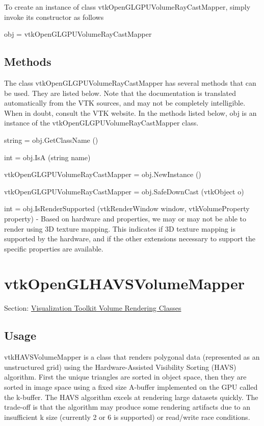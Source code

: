 To create an instance of class vtk\-Open\-G\-L\-G\-P\-U\-Volume\-Ray\-Cast\-Mapper, simply invoke its constructor as follows \begin{DoxyVerb}  obj = vtkOpenGLGPUVolumeRayCastMapper
\end{DoxyVerb}
 \hypertarget{vtkwidgets_vtkxyplotwidget_Methods}{}\subsection{Methods}\label{vtkwidgets_vtkxyplotwidget_Methods}
The class vtk\-Open\-G\-L\-G\-P\-U\-Volume\-Ray\-Cast\-Mapper has several methods that can be used. They are listed below. Note that the documentation is translated automatically from the V\-T\-K sources, and may not be completely intelligible. When in doubt, consult the V\-T\-K website. In the methods listed below, {\ttfamily obj} is an instance of the vtk\-Open\-G\-L\-G\-P\-U\-Volume\-Ray\-Cast\-Mapper class. 
\begin{DoxyItemize}
\item {\ttfamily string = obj.\-Get\-Class\-Name ()}  
\item {\ttfamily int = obj.\-Is\-A (string name)}  
\item {\ttfamily vtk\-Open\-G\-L\-G\-P\-U\-Volume\-Ray\-Cast\-Mapper = obj.\-New\-Instance ()}  
\item {\ttfamily vtk\-Open\-G\-L\-G\-P\-U\-Volume\-Ray\-Cast\-Mapper = obj.\-Safe\-Down\-Cast (vtk\-Object o)}  
\item {\ttfamily int = obj.\-Is\-Render\-Supported (vtk\-Render\-Window window, vtk\-Volume\-Property property)} -\/ Based on hardware and properties, we may or may not be able to render using 3\-D texture mapping. This indicates if 3\-D texture mapping is supported by the hardware, and if the other extensions necessary to support the specific properties are available.  
\end{DoxyItemize}\hypertarget{vtkvolumerendering_vtkopenglhavsvolumemapper}{}\section{vtk\-Open\-G\-L\-H\-A\-V\-S\-Volume\-Mapper}\label{vtkvolumerendering_vtkopenglhavsvolumemapper}
Section\-: \hyperlink{sec_vtkvolumerendering}{Visualization Toolkit Volume Rendering Classes} \hypertarget{vtkwidgets_vtkxyplotwidget_Usage}{}\subsection{Usage}\label{vtkwidgets_vtkxyplotwidget_Usage}
vtk\-H\-A\-V\-S\-Volume\-Mapper is a class that renders polygonal data (represented as an unstructured grid) using the Hardware-\/\-Assisted Visibility Sorting (H\-A\-V\-S) algorithm. First the unique triangles are sorted in object space, then they are sorted in image space using a fixed size A-\/buffer implemented on the G\-P\-U called the k-\/buffer. The H\-A\-V\-S algorithm excels at rendering large datasets quickly. The trade-\/off is that the algorithm may produce some rendering artifacts due to an insufficient k size (currently 2 or 6 is supported) or read/write race conditions.

